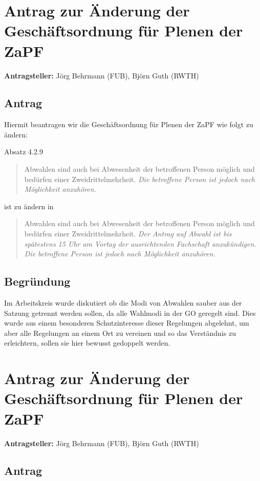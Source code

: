 \documentclass[draft,10pt,oneside]{scrartcl}
\begin{document}
\section*{Antrag zur Änderung der Geschäftsordnung für Plenen der ZaPF}

\textbf{Antragsteller:} Jörg Behrmann (FUB), Björn Guth (RWTH)

\subsection*{Antrag}

Hiermit beantragen wir die Geschäftsordnung für Plenen der ZaPF wie folgt zu
ändern:

Absatz 4.2.9
\begin{quote} Abwahlen sind auch bei Abwesenheit der betroffenen Person möglich
und bedürfen einer Zweidrittelmehrheit. \emph{Die betroffene Person ist jedoch
nach Möglichkeit anzuhören.}
\end{quote} ist zu ändern in
\begin{quote} Abwahlen sind auch bei Abwesenheit der betroffenen Person möglich
und bedürfen einer Zweidrittelmehrheit. \emph{Der Antrag auf Abwahl ist bis
spätestens 15 Uhr am Vortag der ausrichtenden Fachschaft anzukündigen. Die
betroffene Person ist jedoch nach Möglichkeit anzuhören.}
\end{quote}

\subsection*{Begründung}

Im Arbeitskreis wurde diskutiert ob die Modi von Abwahlen sauber aus der Satzung
getrennt werden sollen, da alle Wahlmodi in der GO geregelt sind. Dies wurde aus
einem besonderen Schutzinteresse dieser Regelungen abgelehnt, um aber alle
Regelungen an einem Ort zu vereinen und so das Verständnis zu erleichtern,
sollen sie hier bewusst gedoppelt werden.

\newpage

\section*{Antrag zur Änderung der Geschäftsordnung für Plenen der ZaPF}

\textbf{Antragsteller:} Jörg Behrmann (FUB), Björn Guth (RWTH)

\subsection*{Antrag}
\end{document}
